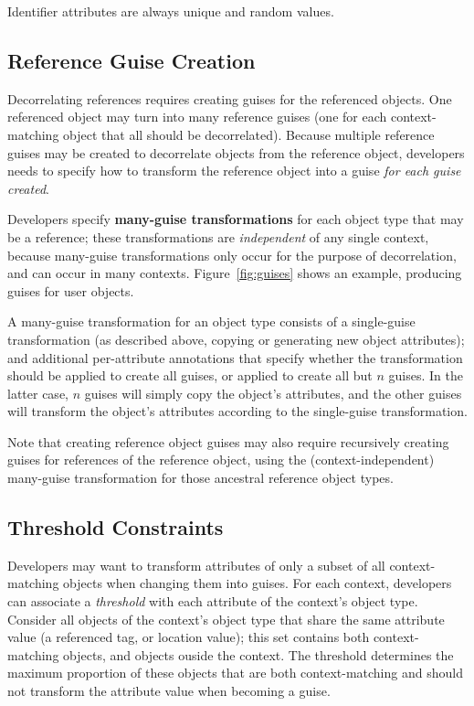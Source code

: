 Identifier attributes are always unique and random values.

\subsection{Reference Guise Creation}
\label{sec:reference_guises} 
%
Decorrelating references requires creating guises for the referenced objects. One referenced object may turn into many
reference guises (one for each context-matching object that all should be decorrelated).  Because
multiple reference guises may be created to decorrelate objects from the reference object,
developers needs to specify how to transform the reference object into a guise \emph{for each guise
created}.

%
Developers specify \textbf{many-guise transformations} for each object type that may be a reference;
these transformations are \emph{independent} of any single context, because many-guise
transformations only occur for the purpose of decorrelation, and can occur in many contexts.
%
Figure~\ref{fig:guises} shows an example, producing guises for user objects.

A many-guise transformation for an object type consists of a single-guise transformation (as
described above, \ie copying or generating new object attributes); and additional per-attribute
annotations that specify whether the transformation should be applied to create all guises, or
applied to create all but $n$ guises. In the latter case, $n$ guises will simply copy the
object's attributes, and the other guises will transform the object's attributes according to the
single-guise transformation.

Note that creating reference object guises may also require recursively creating guises for references of
the reference object, using the (context-independent) many-guise transformation for those ancestral reference
object types.
%
%

\subsection{Threshold Constraints}
\label{sec:threshold} 

Developers may want to transform attributes of only a subset of all context-matching objects when
changing them into guises.  
For each context, developers can associate a \emph{threshold} with each attribute of the context's
object type. Consider all objects of the context's object type that share the same attribute value
(\eg a referenced tag, or location value); this set contains both context-matching objects, and
objects ouside the context. The threshold determines the maximum proportion of these objects that
are both context-matching and should not transform the attribute value when becoming a guise.

